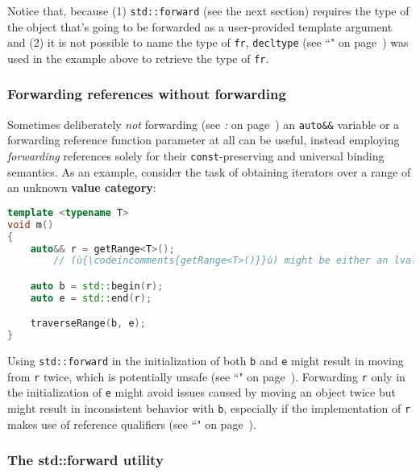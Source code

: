 \noindent Notice that, because (1) \texttt{std::forward} (see the next section) requires the
type of the object that's going to be forwarded as a user-provided
template argument and (2) it is not possible to name the type of
\texttt{fr}, \texttt{decltype} (see ``" on page~\pageref{decltype}) was used in the example above
to retrieve the type of \texttt{fr}.

\subsubsection[Forwarding references without forwarding]{Forwarding references without forwarding}\label{forwarding-references-without-forwarding}

Sometimes deliberately \emph{not} forwarding (see \textit{: } on page~\pageref{the-std::forward-utility}) an \texttt{auto\&\&} variable or
a forwarding reference function parameter at all can be useful, instead employing
\emph{forwarding} references solely for their \texttt{const}-preserving
and universal binding semantics. As an example, consider the task of
obtaining iterators over a range of an unknown \textbf{value category}:

\begin{lstlisting}[language=C++]
template <typename T>
void m()
{
    auto&& r = getRange<T>();
        // (ù{\codeincomments{getRange<T>()}}ù) might be either an lvalue or rvalue depending on (ù{\codeincomments{T}}ù).

    auto b = std::begin(r);
    auto e = std::end(r);

    traverseRange(b, e);
}
\end{lstlisting}
    
\noindent Using \texttt{std::forward} in the initialization of both \texttt{b} and
\texttt{e} might result in moving from \texttt{r} twice, which is
potentially unsafe (see ``" on page~\pageref{Rvalue-References}). Forwarding
\texttt{r} only in the initialization of \texttt{e} might avoid issues
caused by moving an object twice but might result in inconsistent
behavior with \texttt{b}, especially if the implementation of \texttt{r}
makes use of reference qualifiers (see ``" on page~\pageref{refqualifiers}).

\subsubsection[The {\tt std::forward} utility]{The {\SubsubsecCode std::forward} utility}\label{the-std::forward-utility}


